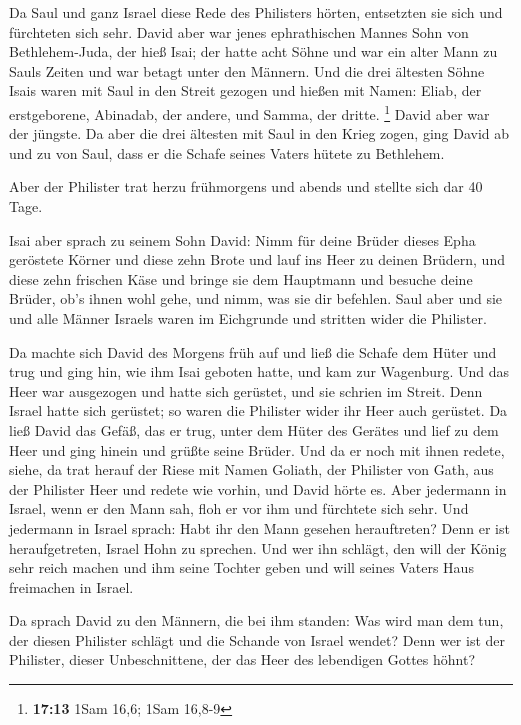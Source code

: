  Da Saul und ganz Israel diese Rede des Philisters
hörten, entsetzten sie sich und fürchteten sich sehr. 
David aber war jenes ephrathischen Mannes Sohn von Bethlehem-Juda, der
hieß Isai; der hatte acht Söhne und war ein alter Mann zu Sauls Zeiten
und war betagt unter den Männern.  Und die drei ältesten
Söhne Isais waren mit Saul in den Streit gezogen und hießen mit Namen:
Eliab, der erstgeborene, Abinadab, der andere, und Samma, der dritte.
\footnote{\textbf{17:13} 1Sam 16,6; 1Sam 16,8-9}  David
aber war der jüngste. Da aber die drei ältesten mit Saul in den Krieg
zogen,  ging David ab und zu von Saul, dass er die Schafe
seines Vaters hütete zu Bethlehem.

 Aber der Philister trat herzu frühmorgens und abends und
stellte sich dar 40 Tage.

 Isai aber sprach zu seinem Sohn David: Nimm für deine
Brüder dieses Epha geröstete Körner und diese zehn Brote und lauf ins
Heer zu deinen Brüdern,  und diese zehn frischen Käse und
bringe sie dem Hauptmann und besuche deine Brüder, ob's ihnen wohl gehe,
und nimm, was sie dir befehlen.  Saul aber und sie und
alle Männer Israels waren im Eichgrunde und stritten wider die
Philister.

 Da machte sich David des Morgens früh auf und ließ die
Schafe dem Hüter und trug und ging hin, wie ihm Isai geboten hatte, und
kam zur Wagenburg. Und das Heer war ausgezogen und hatte sich gerüstet,
und sie schrien im Streit.  Denn Israel hatte sich
gerüstet; so waren die Philister wider ihr Heer auch gerüstet.
 Da ließ David das Gefäß, das er trug, unter dem Hüter
des Gerätes und lief zu dem Heer und ging hinein und grüßte seine
Brüder.  Und da er noch mit ihnen redete, siehe, da trat
herauf der Riese mit Namen Goliath, der Philister von Gath, aus der
Philister Heer und redete wie vorhin, und David hörte es.
 Aber jedermann in Israel, wenn er den Mann sah, floh er
vor ihm und fürchtete sich sehr.  Und jedermann in Israel
sprach: Habt ihr den Mann gesehen herauftreten? Denn er ist
heraufgetreten, Israel Hohn zu sprechen. Und wer ihn schlägt, den will
der König sehr reich machen und ihm seine Tochter geben und will seines
Vaters Haus freimachen in Israel.

 Da sprach David zu den Männern, die bei ihm standen: Was
wird man dem tun, der diesen Philister schlägt und die Schande von
Israel wendet? Denn wer ist der Philister, dieser Unbeschnittene, der
das Heer des lebendigen Gottes höhnt?

